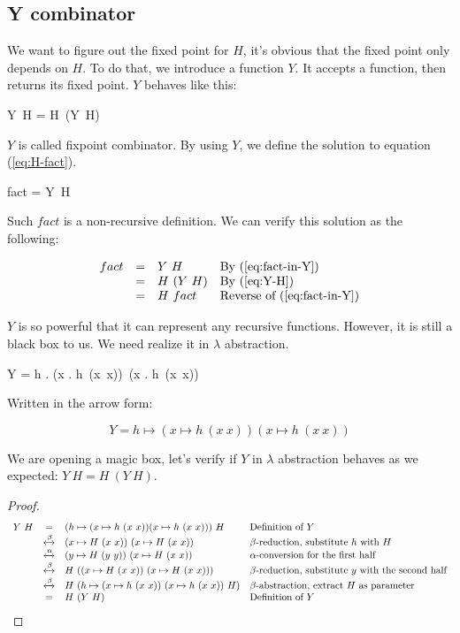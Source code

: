\documentclass{article}
\begin{document}
\subsection{Y combinator}

We want to figure out the fixed point for $H$, it's obvious that the fixed point only depends on $H$. To do that, we introduce a function $Y$. It accepts a function, then returns its fixed point. $Y$ behaves like this:

\be
Y\ H = H\ (Y\ H)
\label{eq:Y-H}
\ee

$Y$ is called fixpoint combinator. By using $Y$, we define the solution to equation (\ref{eq:H-fact}).

\be
fact = Y\ H
\label{eq:fact-in-Y}
\ee

Such $fact$ is a non-recursive definition. We can verify this solution as the following:

\[
\begin{array}{rcll}
fact & = & Y\ H & \text{By (\ref{eq:fact-in-Y})} \\
     & = & H\ (Y\ H) & \text{By (\ref{eq:Y-H})} \\
     & = & H\ fact & \text{Reverse of (\ref{eq:fact-in-Y})}
\end{array}
\]

$Y$ is so powerful that it can represent any recursive functions. However, it is still a black box to us. We need realize it in $\lambda$ abstraction.

\be
Y = \lambda h . (\lambda x . h\ (x\ x))\ (\lambda x . h\ (x\ x))
\ee

Written in the arrow form:

\[
Y = h \mapsto (x \mapsto h\ (x\ x)) (x \mapsto h\ (x\ x))
\]

We are opening a magic box, let's verify if $Y$ in $\lambda$ abstraction behaves as we expected: $Y\ H = H\ (Y\ H)$.

\begin{proof}
\[
\begin{array}{rcll}
Y\ H & = & (h \mapsto (x \mapsto h\ (x\ x)) (x \mapsto h\ (x\ x)))\ H & \text{Definition of $Y$} \\
     & \xleftrightarrow{\beta} & (x \mapsto H\ (x\ x))\ (x \mapsto H\ (x\ x)) & \text{$\beta$-reduction, substitute $h$ with $H$} \\
     & \xleftrightarrow{\alpha} & (y \mapsto H\ (y\ y))\ (x \mapsto H\ (x\ x)) & \text{$\alpha$-conversion for the first half} \\
     & \xleftrightarrow{\beta} & H\ ((x \mapsto H\ (x\ x))\ (x \mapsto H\ (x\ x))) & \text{$\beta$-reduction, substitute $y$ with the second half} \\
     & \xleftrightarrow{\beta} & H\ (h \mapsto (x \mapsto h\ (x\ x))\ (x \mapsto h\ (x\ x))\ H) & \text{$\beta$-abstraction, extract $H$ as parameter} \\
     & = & H\ (Y\ H) & \text{Definition of $Y$}
\end{array}
\]
\end{proof}
\end{document}
